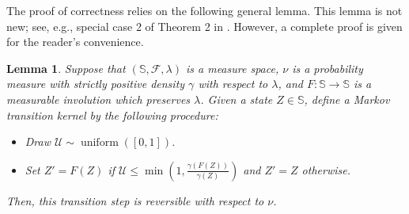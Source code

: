 \documentclass[letterpaper,11pt]{article}
\theoremstyle{plain}%
\newtheorem{lemma}[prototheorem]{Lemma}
\theoremstyle{remark}
\begin{document}
The proof of correctness relies on the following general lemma. This lemma is not new; see, e.g.,  special case 2 of Theorem 2 in \cite{Tierney1998}.  However, a complete proof is given for the reader's convenience.

\begin{lemma} \label{lem:DeterministicMetropolization} 
Suppose that $(\mathbb{S}, \mathcal{F}, \lambda)$ is a measure space, $\nu$ is a probability measure with strictly positive density $ \gamma$ with respect to $\lambda$, and $F: \mathbb{S}\to \mathbb{S}$ is a measurable involution which preserves $\lambda$. Given a state $Z \in \mathbb{S}$, define a Markov transition kernel by the following procedure:
\begin{itemize}
    \item Draw $\mathcal{U} \sim \operatorname{uniform}([0,1])$.
    \item Set $Z' = F(Z)$ if  $\mathcal{U} \le \min\left(1, \frac{\gamma(F(Z))}{\gamma(Z)} \right)$ and $Z' = Z$ otherwise.
\end{itemize}
Then, this transition step is reversible with respect to $\nu$.
\end{lemma}
\end{document}
